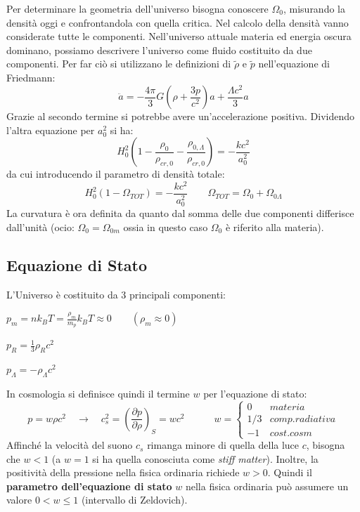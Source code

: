 Per determinare la geometria dell'universo bisogna conoscere $\Omega_0$, misurando la densità oggi e confrontandola con quella critica. Nel calcolo della densità vanno considerate tutte le componenti.
Nell'universo attuale materia ed energia oscura dominano, possiamo descrivere l'universo come fluido costituito da due componenti. Per far ciò si utilizzano le definizioni di $\tilde{\rho}$ e $\tilde{p}$ nell'equazione di Friedmann:
$$
\ddot{a}  =-\frac{4\pi}{3}G\left ( \rho+\frac{3p}{c^2} \right ) a + \frac{\Lambda c^2}{3}a
$$
Grazie al secondo termine si potrebbe avere un'accelerazione positiva.
Dividendo l'altra equazione per $a_0^2$  si ha:
\begin{equation}
    H_0^2 \left ( 1-\frac{\rho_0}{\rho_{cr,0}} -\frac{\rho_{0,\Lambda}}{\rho_{cr,0}} \right ) = -\frac{kc^2}{a_0^2}
\end{equation}
da cui introducendo il parametro di densità totale:
\begin{equation}
    H_0^2 \left ( 1-\Omega_{TOT} \right ) = -\frac{kc^2}{a_0^2}\qquad \Omega_{TOT}=\Omega_{0}+\Omega_{0\Lambda} \label{eq:2omega0k}
\end{equation}
La curvatura è ora definita da quanto dal somma delle due componenti differisce dall'unità (ocio: $\Omega_0 = \Omega_{0m}$ ossia in questo caso $\Omega_0$ è riferito alla materia). 


\subsection{Equazione di Stato}
L'Universo è costituito da 3 principali componenti:

\begin{example}
$p_m=nk_B T = \frac{\rho_m}{m_p}k_B T \approx 0 \qquad ( \rho_m \approx 0) $
\end{example}
\begin{example}
$p_R=\frac{1}{3} \rho_R c^2 $
\end{example}
\begin{example}
$p_\Lambda= -\rho_\Lambda c^2 $
\end{example}

In cosmologia si definisce quindi il termine $w$ per l'equazione di stato:
\begin{equation}
    p=w\rho c^2\quad\rightarrow \quad c_s^2=\left ( \frac{\partial p}{\partial \rho}\right )_{S}=wc^2 \qquad \quad w= \left\{\begin{matrix}
0& materia\\
1/3 & comp. radiativa\\
-1 & cost. cosm
\end{matrix}\right.
\end{equation}
Affinché la velocità del suono $c_s$ rimanga minore di quella della luce $c$, bisogna che $w<1 $ (a $w=1 $ si ha quella conosciuta come \textit{stiff matter}). Inoltre, la positività della pressione nella fisica ordinaria richiede $w>0 $. Quindi il \textbf{parametro dell'equazione di stato} $w $ nella fisica ordinaria può assumere un valore $0<w\leq 1$ (intervallo di Zeldovich).

